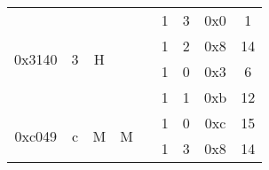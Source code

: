 \documentclass[11pt]{homework}
\newcommand{\cmark}{\ding{51}}%
\begin{document}
\begin{arabicparts}
{\begin{tabular}{|c|c|c|c|c|c|c|c|c|}
            \hline
            \multirow{4}{*}{0x3140}  & \multirow{4}{*}{3}                                                     & \multirow{4}{*}{H}                                                & \multirow{4}{*}{}                                                  & \multirow{4}{*}{}                                                    & 1                        & 3         & 0x0 & 1             \\
            \cline{6-9}
                                     &                                                                        &                                                                   &                                                                    &                                                                      & 1                        & 2         & 0x8 & 14            \\
            \cline{6-9}
                                     &                                                                        &                                                                   &                                                                    &                                                                      & 1                        & 0         & 0x3 & 6             \\
            \cline{6-9}
                                     &                                                                        &                                                                   &                                                                    &                                                                      & 1                        & 1         & 0xb & 12            \\
            \hline
            \multirow{4}{*}{0xc049}  & \multirow{4}{*}{c}                                                     & \multirow{4}{*}{M}                                                & \multirow{4}{*}{M}                                                 & \multirow{4}{*}{\cmark}                                              & 1                        & 0         & 0xc & 15            \\
            \cline{6-9}
                                     &                                                                        &                                                                   &                                                                    &                                                                      & 1                        & 3         & 0x8 & 14            \\

\end{tabular}}
\end{arabicparts}
\end{document}
